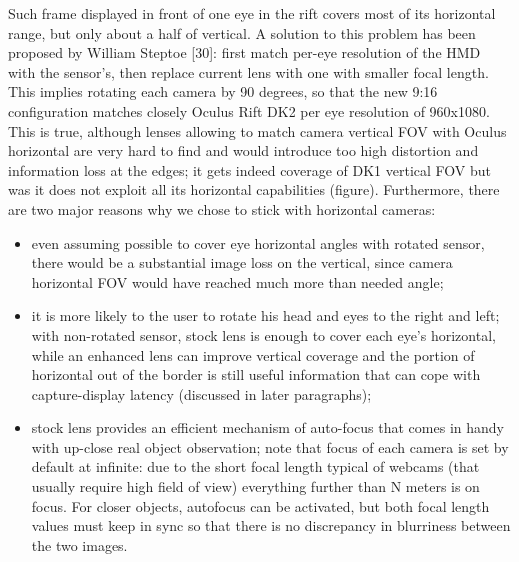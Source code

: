 Such frame displayed in front of one eye in the rift covers most of its horizontal range, but only about a half of vertical. A solution to this problem has been proposed by William Steptoe [30]: first match per-eye resolution of the HMD with the sensor's, then replace current lens with one with smaller focal length. This implies rotating each camera by 90 degrees, so that the new 9:16 configuration matches closely Oculus Rift DK2 per eye resolution of 960x1080. This is true, although lenses allowing to match camera vertical FOV with Oculus horizontal are very hard to find and would introduce too high distortion and information loss at the edges; it gets indeed coverage of DK1 vertical FOV but was it does not exploit all its horizontal capabilities (figure). Furthermore, there are two major reasons why we chose to stick with horizontal cameras:
\begin{itemize}
\item even assuming possible to cover eye horizontal angles with rotated sensor, there would be a substantial image loss on the vertical, since camera horizontal FOV would have reached much more than needed angle;
\item it is more likely to the user to rotate his head and eyes to the right and left; with non-rotated sensor, stock lens is enough to cover each eye's horizontal, while an enhanced lens can improve vertical coverage and the portion of horizontal out of the border is still useful information that can cope with capture-display latency (discussed in later paragraphs);
\item stock lens provides an efficient mechanism of auto-focus that comes in handy with up-close real object observation; note that focus of each camera is set by default at infinite: due to the short focal length typical of webcams (that usually require high field of view) everything further than N meters is on focus. For closer objects, autofocus can be activated, but both focal length values must keep in sync so that there is no discrepancy in blurriness between the two images.
\end{itemize}
